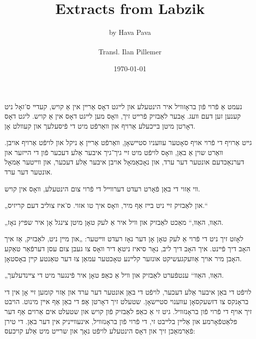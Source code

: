 \documentclass{memoir}
\begin{document}
\renewcommand{\abstractname}{\vspace{-\baselineskip}}
\title{Extracts from Labzik}
\author{by Hava Pava \\ \\ Transl. Ilan Pillemer}
\date{\today}

\maketitle

\tableofcontents

\begin{pairs}

\begin{Rightside}

\begin{RTL}
\begin{hebrew}
\beginnumbering

\autopar

נעמט אַ פֿרוי פֿון בראָזװיל איר הינטעלע און לײגט דאָס אַרײן
אין אַ קויש, קעדײ ס'זאָל ניט קענען זען דעם װעג. אָבער לאַבזיק
פֿרײט זיך, װאָס מען לײגט דאָס אין אַ קויש.  ליגט דאָס דאָרטן מיטן
בײכעלע אַרויף און װאַרפֿט מיט די פֿיסעלעך און קעװלט אָן.

גײט אַרויף די פֿרוי אויף סאָטער עװעניו סטײשאָן, װאַרפֿט אַרײן
אַ ניקל און לויפֿט אַרויף אויבן. װאַרט שוין אַ באַן, װאָס לויפֿט מיט
זײ גיך־גיך איבער אַלע דעכער פֿון די הײזער און דערנאַכדעם אונטער
דער ערד, און נאָכאַמאָל אויבן איבער אַלע דעכער, און װײטער אַמאָל
אונטער דער ערד.

װי אַזוי די באַן פֿאָרט רעדט דערװײל די פֿרוי צום הינטעלע,
װאָס אין קויש.

„און לאַבזיק זײ ניט בײז אַף מיר, װאָס איך טו אזוי. ס'איז צוליב דעם קריזיס.“

„האַװ, האַװ,“ מאַכט לאַבזיק און װיל איר אַ לעק טאָן מיטן
צינגל אָן איר שפּיץ נאָז.

לאָזט זיך ניט די פֿרוי אַ לעק טאָן אָן דער נאָז רעדט װײטער:
„און מײן ניט, לאַבזיק, אַז איך האָב דיך פֿײנט. איך האָב  דיך
ליב, נאָר סיאיז ניטאָ דיר װאָס צו געבן צום עסן דערפֿאַר טאַקע
האָבן מיר אויך אַװעקגעשיקט אונזער קלײנע טאָכטער עמאַן צוּ דער 
טאַנטע קײן באָסטאָן.

„האַװ, האַװ“ ענטפֿערט לאַבזיק און װיל אַ כאַפּ טאָן איר
פֿינגער מיט די צײנדעלעך.

לויפֿט די באַן איבער אַלע דעכער, לויפֿט די באַן אונטער דער
ערד און אַזוי קומען זײ אָן אין די בראָנקס צו דזשעקסאָן עװענוי
סטײשאָן. שטעלט זיך דאָרטן אָפּ די באַן אַף אײן מינוט. הויבט זיך
אויף די פֿרוי פֿון בראָנזװיל. גיט זי אַ כאַפּ לאַבזיק פֿון קויש און
שטעלט אים אַרוים אַף דער פּלאַטפֿאָרמע און אַלײן בלײבט זי, די
פֿרוי פֿון בראָנזװיל, אינעװײניק אין דער באַן. די טירן פֿאַרמאַכן זיך
און דאָס הינטעלע לויפֿט נאָך און שרײט מיט אַלע קויכעס:


\end{hebrew}
\end{RTL}
\end{Rightside}
\end{pairs}
\end{document}
